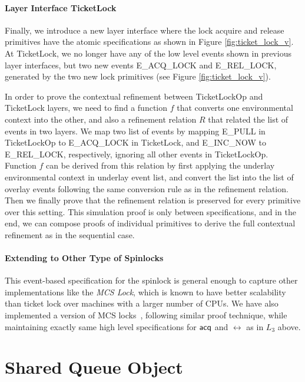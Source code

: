 \paragraph{Layer Interface TicketLock}

Finally, we introduce a new layer interface where the lock acquire and release
primitives have the atomic specifications as shown in Figure \ref{fig:ticket_lock_v}.
At TicketLock, we no longer have any of the low level events shown in previous
layer interfaces, but two new events \textsf{E\_ACQ\_LOCK} and \textsf{E\_REL\_LOCK},
generated by the two new lock primitives (see Figure \ref{fig:ticket_lock_v}).

In order to prove the contextual refinement between TicketLockOp and
TicketLock layers, we need to find a function $f$ that converts
one environmental context into the other, and also a refinement relation
$R$ that related the list of events in two layers.
We map two list of events by mapping \textsf{E\_PULL} in 
TicketLockOp to \textsf{E\_ACQ\_LOCK} in TicketLock,
and \textsf{E\_INC\_NOW} to  \textsf{E\_REL\_LOCK}, respectively, ignoring all other
events in TicketLockOp. Function $f$ can be derived from this relation by
first applying the underlay environmental context in underlay event list,
and convert the list into the list of overlay events following the same conversion
rule as in the refinement relation.
Then we finally prove that the refinement relation is preserved for every primitive
over this setting.
This simulation proof is only between specifications, and in the end,
we can compose proofs of individual primitives to derive the full
contextual refinement as in the sequential case.

\paragraph{Extending to Other Type of Spinlocks}
This event-based specification for the spinlock is general enough
to capture  other implementations like the \emph{MCS Lock},
which is known to have better scalability than ticket lock
over machines with a larger number of CPUs. We have also
implemented a version of MCS locks~\cite{kim2017safety}, following
similar proof technique, while maintaining exactly same high level
specifications for $\mathsf{acq}$ and $\rel$ as in $L_3$ above.


\section{Shared Queue Object}

